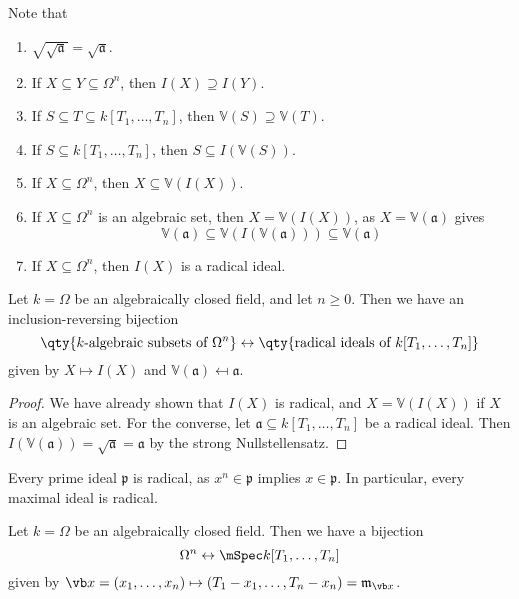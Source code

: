 Note that
\begin{enumerate}
    \item \( \sqrt{\sqrt{\mathfrak a}} = \sqrt{\mathfrak a} \).
    \item If \( X \subseteq Y \subseteq \Omega^n \), then \( I(X) \supseteq I(Y) \).
    \item If \( S \subseteq T \subseteq k[T_1, \dots, T_n] \), then \( \mathbb V(S) \supseteq \mathbb V(T) \).
    \item If \( S \subseteq k[T_1, \dots, T_n] \), then \( S \subseteq I(\mathbb V(S)) \).
    \item If \( X \subseteq \Omega^n \), then \( X \subseteq \mathbb V(I(X)) \).
    \item If \( X \subseteq \Omega^n \) is an algebraic set, then \( X = \mathbb V(I(X)) \), as \( X = \mathbb V(\mathfrak a) \) gives
    \[ \mathbb V(\mathfrak a) \subseteq \mathbb V(I(\mathbb V(\mathfrak a))) \subseteq \mathbb V(\mathfrak a) \]
    \item If \( X \subseteq \Omega^n \), then \( I(X) \) is a radical ideal.
\end{enumerate}
\begin{proposition}
    Let \( k = \Omega \) be an algebraically closed field, and let \( n \geq 0 \).
    Then we have an inclusion-reversing bijection
    \[ \qty{\text{\( k \)-algebraic subsets of } \Omega^n} \leftrightarrow \qty{\text{radical ideals of } k[T_1, \dots, T_n]} \]
    given by \( X \mapsto I(X) \) and \( \mathbb V(\mathfrak a) \mapsfrom \mathfrak a \).
\end{proposition}
\begin{proof}
    We have already shown that \( I(X) \) is radical, and \( X = \mathbb V(I(X)) \) if \( X \) is an algebraic set.
    For the converse, let \( \mathfrak a \subseteq k[T_1, \dots, T_n] \) be a radical ideal.
    Then \( I(\mathbb V(\mathfrak a)) = \sqrt{\mathfrak a} = \mathfrak a \) by the strong Nullstellensatz.
\end{proof}
\begin{remark}
    Every prime ideal \( \mathfrak p \) is radical, as \( x^n \in \mathfrak p \) implies \( x \in \mathfrak p \).
    In particular, every maximal ideal is radical.
\end{remark}
\begin{corollary}
    Let \( k = \Omega \) be an algebraically closed field.
    Then we have a bijection
    \[ \Omega^n \leftrightarrow \mSpec k[T_1, \dots, T_n] \]
    given by \( \vb x = (x_1, \dots, x_n) \mapsto (T_1 - x_1, \dots, T_n - x_n) = \mathfrak m_{\vb x} \).
\end{corollary}
